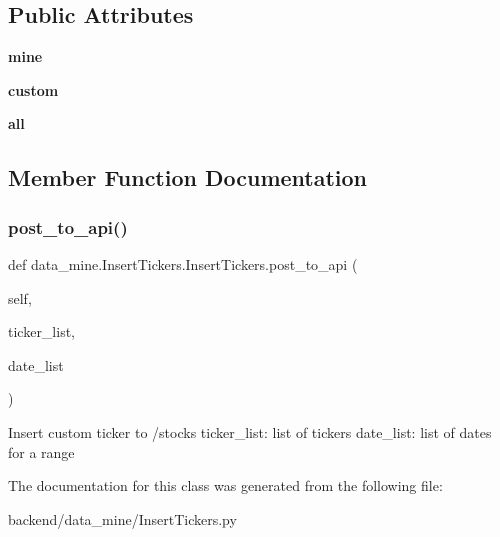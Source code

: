 \subsection*{Public Attributes}
\begin{DoxyCompactItemize}
\item 
\mbox{\label{classdata__mine_1_1_insert_tickers_1_1_insert_tickers_ac3446c530e26a42c28900c1440c39098}} 
{\bfseries mine}
\item 
\mbox{\label{classdata__mine_1_1_insert_tickers_1_1_insert_tickers_a0787a916b4f64dfecda45affbf3b992d}} 
{\bfseries custom}
\item 
\mbox{\label{classdata__mine_1_1_insert_tickers_1_1_insert_tickers_aa9a83795442e916a9cd789bf114d4d48}} 
{\bfseries all}
\end{DoxyCompactItemize}


\subsection{Member Function Documentation}
\mbox{\label{classdata__mine_1_1_insert_tickers_1_1_insert_tickers_a817932df15b0d8af46ccb0f3b3f009be}} 
\subsubsection{\texorpdfstring{post\+\_\+to\+\_\+api()}{post\_to\_api()}}
{\footnotesize\ttfamily def data\+\_\+mine.\+Insert\+Tickers.\+Insert\+Tickers.\+post\+\_\+to\+\_\+api (\begin{DoxyParamCaption}\item[{}]{self,  }\item[{}]{ticker\+\_\+list,  }\item[{}]{date\+\_\+list }\end{DoxyParamCaption})}

\begin{DoxyVerb}Insert custom ticker to /stocks
    ticker_list: list of tickers
    date_list: list of dates for a range
\end{DoxyVerb}
 

The documentation for this class was generated from the following file\+:\begin{DoxyCompactItemize}
\item 
backend/data\+\_\+mine/Insert\+Tickers.\+py\end{DoxyCompactItemize}
